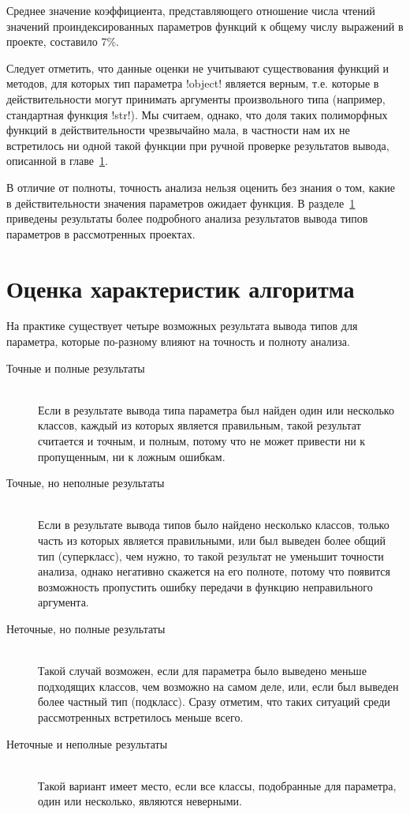 Среднее значение коэффициента, представляющего отношение числа чтений значений
проиндексированных параметров функций к общему числу выражений в проекте,
составило 7\%.

Следует отметить, что данные оценки не учитывают существования функций и
методов, для которых тип параметра !object! является верным, т.е.  которые в
действительности могут принимать аргументы произвольного типа (например,
стандартная функция !str!). Мы считаем, однако, что доля таких полиморфных
функций в действительности чрезвычайно мала, в частности нам их не встретилось
ни одной такой функции при ручной проверке результатов вывода, описанной в
главе~\ref{sec:precise-analysis}.

В отличие от полноты, точность анализа нельзя оценить без знания о том, какие в
действительности значения параметров ожидает функция. В
разделе~\ref{sec:precise-analysis} приведены результаты более подробного анализа
результатов вывода типов параметров в рассмотренных проектах.

\section{Оценка характеристик алгоритма}
\label{sec:precise-analysis}

На практике существует четыре возможных результата вывода типов для параметра,
которые по-разному влияют на точность и полноту анализа.

\begin{description}

  \item[Точные и полные результаты] \hfill \\
    Если в результате вывода типа параметра был найден один или несколько
    классов, каждый из которых является правильным, такой результат считается и
    точным, и полным, потому что не может привести ни к пропущенным, ни к ложным
    ошибкам.
    
  \item[Точные, но неполные результаты] \hfill \\
    Если в результате вывода типов было найдено несколько классов, только часть
    из которых является правильными, или был выведен более общий тип
    (суперкласс), чем нужно, то такой результат не уменьшит точности анализа,
    однако негативно скажется на его полноте, потому что появится возможность
    пропустить ошибку передачи в функцию неправильного аргумента.

  \item[Неточные, но полные результаты] \hfill \\
    Такой случай возможен, если для параметра было выведено меньше подходящих
    классов, чем возможно на самом деле, или, если был выведен более частный тип
    (подкласс). Сразу отметим, что таких ситуаций среди рассмотренных
    встретилось меньше всего.

  \item[Неточные и неполные результаты] \hfill \\
    Такой вариант имеет место, если все классы, подобранные для параметра, один
    или несколько, являются неверными.

\end{description}

